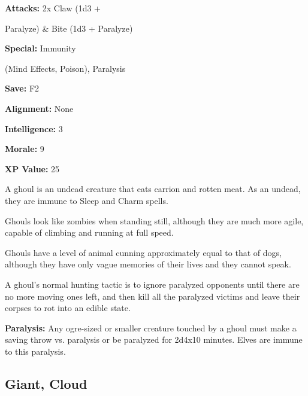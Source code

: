 \begin{multicols*}{2}
{{\textbf{Attacks:} 2x Claw (1d3 + 

Paralyze) \& Bite (1d3 + Paralyze)

\textbf{Special:} Immunity 

(Mind Effects, Poison), Paralysis

\textbf{Save:} F2

\textbf{Alignment:} None

\textbf{Intelligence:} 3

\textbf{Morale:} 9

\textbf{XP Value:} 25}}

A ghoul is an undead creature that eats carrion and rotten meat. As an undead, they are immune to Sleep and Charm spells.

Ghouls look like zombies when standing still, although they are much more agile, capable of climbing and running at full speed.

Ghouls have a level of animal cunning approximately equal to that of dogs, although they have only vague memories of their lives and they cannot speak.

A ghoul’s normal hunting tactic is to ignore paralyzed opponents until there are no more moving ones left, and then kill all the paralyzed victims and leave their corpses to rot into an edible state.

\textbf{Paralysis:} Any ogre-sized or smaller creature touched by a ghoul must make a saving throw vs. paralysis or be paralyzed for 2d4x10 minutes. Elves are immune to this paralysis.

\subsection{Giant, Cloud}
\end{multicols*}
